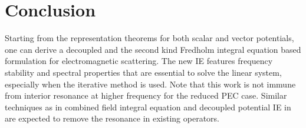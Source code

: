 \documentclass[conference]{IEEEtran}
\begin{document}
\section{Conclusion}
Starting from the representation theorems for both scalar and vector potentials,
one can derive a decoupled and the second kind Fredholm integral equation based formulation for electromagnetic scattering. The new IE features frequency stability and spectral properties that are essential to solve the linear system, especially when the iterative method is used. Note that this work is not immune from interior resonance at higher frequency for the reduced PEC case. Similar techniques as in combined field integral equation and decoupled potential IE in \cite{Vico2016} are expected to remove the resonance in existing operators.





\end{document}
